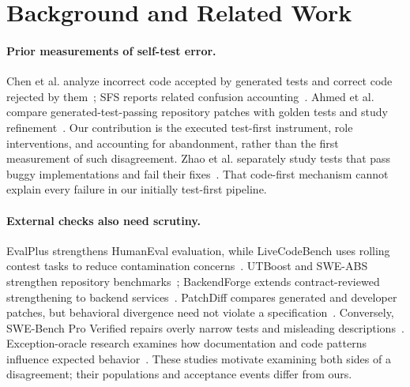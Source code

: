 \section{Background and Related Work}
\label{sec:related}

\paragraph{Prior measurements of self-test error.}
Chen et al. analyze incorrect code accepted by generated tests and correct code rejected
by them~\cite{chen2025revisit}; SFS reports related confusion accounting~\cite{light2025sfs}.
Ahmed et al. compare generated-test-passing repository patches with golden tests and study
refinement~\cite{ahmed2025overfitting}. Our contribution is the executed test-first
instrument, role interventions, and accounting for abandonment, rather than the first
measurement of such disagreement. Zhao et al. separately study tests that pass buggy
implementations and fail their fixes~\cite{zhao2026misguidance}. That code-first mechanism
cannot explain every failure in our initially test-first pipeline.

\paragraph{External checks also need scrutiny.}
EvalPlus strengthens HumanEval evaluation, while LiveCodeBench uses rolling contest tasks
to reduce contamination concerns~\cite{liu2023evalplus,jain2024livecodebench}.
UTBoost and SWE-ABS strengthen repository benchmarks~\cite{yu2025utboost,yu2026sweabs};
BackendForge extends contract-reviewed strengthening to backend services~\cite{guo2026backendforge}.
PatchDiff compares generated and developer patches, but behavioral divergence need not
violate a specification~\cite{wang2025patchdiff}. Conversely, SWE-Bench Pro Verified
repairs overly narrow tests and misleading descriptions~\cite{zheng2026sweproverified}.
Exception-oracle research examines how documentation and code patterns influence expected
behavior~\cite{hossain2026exceptionpatterns}. These studies motivate examining both sides
of a disagreement; their populations and acceptance events differ from ours.

